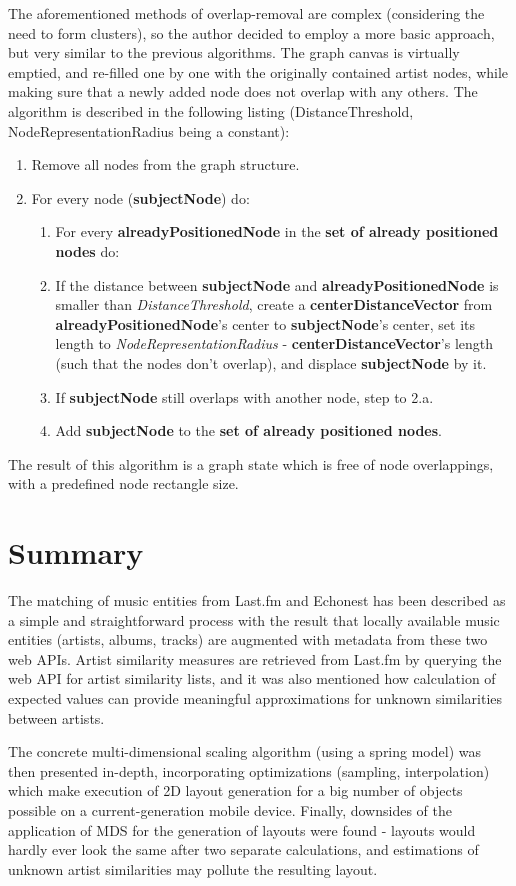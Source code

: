 The aforementioned methods of overlap-removal are complex (considering the need to form clusters), so the author decided to employ a more basic approach, but very similar to the previous algorithms. The graph canvas is virtually emptied, and re-filled one by one with the originally contained artist nodes, while making sure that a newly added node does not overlap with any others. The algorithm is described in the following listing (DistanceThreshold, NodeRepresentationRadius being a constant):

\begin{enumerate}
\item Remove all nodes from the graph structure.	
\item For every node (\textbf{subjectNode}) do:
	\begin{enumerate}
		\item For every \textbf{alreadyPositionedNode} in the \textbf{set of already positioned nodes} do:
		\item If the distance between \textbf{subjectNode} and \textbf{alreadyPositionedNode} is smaller than \emph{DistanceThreshold}, create a \textbf{centerDistanceVector} from \textbf{alreadyPositionedNode}'s center to \textbf{subjectNode}'s center, set
		its length to \emph{NodeRepresentationRadius} - \textbf{centerDistanceVector}'s length (such that the nodes don't overlap), and displace \textbf{subjectNode} by it.
		\item If \textbf{subjectNode} still overlaps with another node, step to 2.a.
		\item Add \textbf{subjectNode} to the \textbf{set of already positioned nodes}.
	\end{enumerate}
\end{enumerate}

The result of this algorithm is a graph state which is free of node overlappings, with a predefined node rectangle size.

\section{Summary}

The matching of music entities from Last.fm and Echonest has been described as a simple and straightforward process with the result that locally available music entities (artists, albums, tracks) are augmented with metadata from these two web APIs. Artist similarity measures are retrieved from Last.fm by querying the web API for artist similarity lists, and it was also mentioned how calculation of expected values can provide meaningful approximations for unknown similarities between artists.

The concrete multi-dimensional scaling algorithm (using a spring model) was then presented in-depth, incorporating optimizations (sampling, interpolation) which make execution of 2D layout generation for a big number of objects possible on a current-generation mobile device. Finally, downsides of the application of MDS for the generation of layouts were found - layouts would hardly ever look the same after two separate calculations, and estimations of unknown artist similarities may pollute the resulting layout.